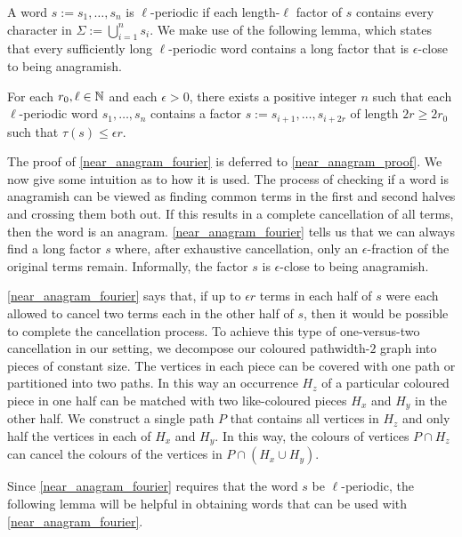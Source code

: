 \documentclass{patmorin}
\begin{document}
A word $s:=s_1,\ldots,s_n$ is $\ell$-periodic if each length-$\ell$ factor of $s$ contains every character in $\Sigma:=\bigcup_{i=1}^n s_i$.  We make use of the following lemma, which states that every sufficiently long $\ell$-periodic word contains a long factor that is $\epsilon$-close to being anagramish.

\begin{lem}\label{near_anagram_fourier}
    For each $r_0,\ell\in\mathbb{N}$ and each $\epsilon>0$, there exists a positive integer $n$ such that each $\ell$-periodic word $s_1,\ldots,s_n$ contains a factor $s:=s_{i+1},\ldots,s_{i+2r}$ of length $2r \ge 2r_0$ such that $\tau(s)\le \epsilon r$.
\end{lem}

The proof of \cref{near_anagram_fourier} is deferred to \cref{near_anagram_proof}.  We now give some intuition as to how it is used.  The process of checking if a word is anagramish can be viewed as finding common terms in the first and second halves and crossing them both out.  If this results in a complete cancellation of all terms, then the word is an anagram.  \cref{near_anagram_fourier} tells us that we can always find a long factor $s$ where, after exhaustive cancellation, only an $\epsilon$-fraction of the original terms remain.  Informally, the factor $s$ is $\epsilon$-close to being anagramish.

\cref{near_anagram_fourier} says that, if up to $\epsilon r$ terms in each half of $s$ were each allowed to cancel two terms each in the other half of $s$, then it would be possible to complete the cancellation process.  To achieve this type of one-versus-two cancellation in our setting, we decompose our coloured pathwidth-$2$ graph into pieces of constant size.  The vertices in each piece can be covered with one path or partitioned into two paths.  In this way an occurrence $H_z$ of a particular coloured piece in one half can be matched with two like-coloured pieces $H_x$ and $H_y$ in the other half. We construct a single path $P$ that contains all vertices in $H_z$ and only half the vertices in each of $H_x$ and $H_y$.  In this way, the colours of vertices $P\cap H_z$ can cancel the colours of the vertices in $P\cap(H_x\cup H_y)$.



Since \cref{near_anagram_fourier} requires that the word $s$ be $\ell$-periodic, the following lemma will be helpful in obtaining words that can be used with \cref{near_anagram_fourier}.
\end{document}
